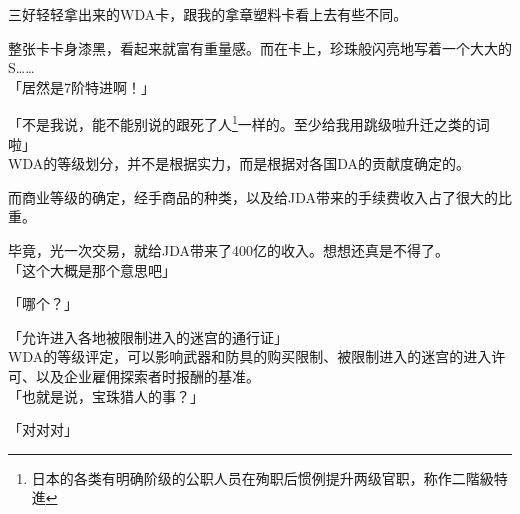 三好轻轻拿出来的WDA卡，跟我的拿章塑料卡看上去有些不同。

整张卡卡身漆黑，看起来就富有重量感。而在卡上，珍珠般闪亮地写着一个大大的S……\\

「居然是7阶特进啊！」

「不是我说，能不能别说的跟死了人\footnote{日本的各类有明确阶级的公职人员在殉职后惯例提升两级官职，称作二階級特進}一样的。至少给我用跳级啦升迁之类的词啦」\\

WDA的等级划分，并不是根据实力，而是根据对各国DA的贡献度确定的。

而商业等级的确定，经手商品的种类，以及给JDA带来的手续费收入占了很大的比重。

毕竟，光一次交易，就给JDA带来了400亿的收入。想想还真是不得了。\\

「这个大概是那个意思吧」

「哪个？」

「允许进入各地被限制进入的迷宫的通行证」\\

WDA的等级评定，可以影响武器和防具的购买限制、被限制进入的迷宫的进入许可、以及企业雇佣探索者时报酬的基准。\\

「也就是说，宝珠猎人的事？」

「对对对」\\

